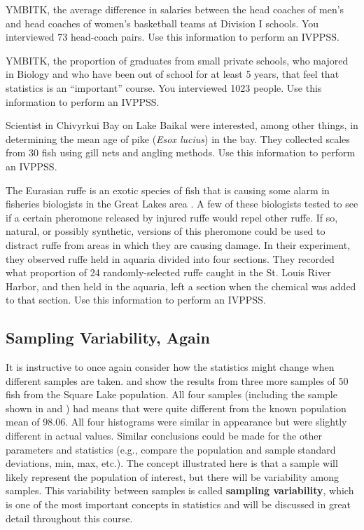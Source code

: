 \documentclass[10pt,openany]{book}\usepackage[]{graphicx}\usepackage[]{color}
\begin{document}
\begin{exsection}
  \item \label{revex:IVPPSSCoach}YMBITK, the average difference in salaries between the head coaches of men's and head coaches of women's basketball teams at Division I schools. You interviewed 73 head-coach pairs.  Use this information to perform an IVPPSS. 
  \item \label{revex:IVPPSSBioGrads}YMBITK, the proportion of graduates from small private schools, who majored in Biology and who have been out of school for at least 5 years, that feel that statistics is an ``important'' course. You interviewed 1023 people.  Use this information to perform an IVPPSS. 
  \item \label{revex:IVPPSSBaikal}Scientist in Chivyrkui Bay on Lake Baikal \citep{OwensPronin2000} were interested, among other things, in determining the mean age of pike (\textit{Esox lucius}) in the bay. They collected scales from 30 fish using gill nets and angling methods. Use this information to perform an IVPPSS. 
  \item \label{revex:IVPPSSRuffe}The Eurasian ruffe is an exotic species of fish that is causing some alarm in fisheries biologists in the Great Lakes area \citep{Maniaketal2000}. A few of these biologists tested to see if a certain pheromone released by injured ruffe would repel other ruffe.  If so, natural, or possibly synthetic, versions of this pheromone could be used to distract ruffe from areas in which they are causing damage. In their experiment, they observed ruffe held in aquaria divided into four sections.  They recorded what proportion of 24 randomly-selected ruffe caught in the St. Louis River Harbor, and then held in the aquaria, left a section when the chemical was added to that section.  Use this information to perform an IVPPSS. 
\end{exsection}


\subsection{Sampling Variability, Again}
It is instructive to once again consider how the statistics might change when different samples are taken.   and  show the results from three more samples of 50 fish from the Square Lake population.  All four samples (including the sample shown in  and ) had means that were quite different from the known population mean of 98.06.  All four histograms were similar in appearance but were slightly different in actual values.  Similar conclusions could be made for the other parameters and statistics (e.g., compare the population and sample standard deviations, min, max, etc.).  The concept illustrated here is that a sample will likely represent the population of interest, but there will be variability among samples.  This variability between samples is called \textbf{sampling variability}, which is one of the most important concepts in statistics and will be discussed in great detail throughout this course.
\end{document}
